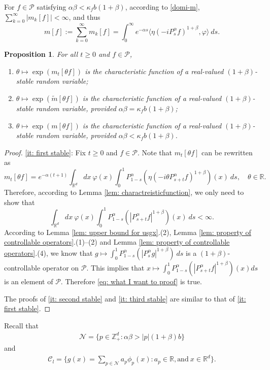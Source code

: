 \documentclass[12pt,a4paper]{amsart}
\theoremstyle{plain}
\newtheorem{prop}[thm]{Proposition}
\theoremstyle{definition}
\numberwithin{equation}{section}
\begin{document}
For  $f\in \mathcal{P}$ satisfying $\alpha\beta<\kappa_fb(1+\beta)$,
according to \eqref{domi-m}, $\sum_{k=0}^\infty |m_k[f]|<\infty$, and  thus
\begin{equation}\label{sum-m}
m[f]
    :=\sum_{k=0}^\infty m_k[f]
    =\int_0^{\infty} e^{-\alpha s} \langle \eta (-iP_s^\alpha f)^{1+\beta}, \varphi \rangle~ds.
\end{equation}

\begin{prop}
\label{cor: alpha stable rv}
	For all $t\geq 0$ and $f\in \mathcal P$,
\begin{enumerate}
\item
\label{it: first stable}
    $\theta \mapsto \exp(m_t[\theta f])$ is the characteristic function of a real-valued $(1+\beta)$-stable random variable;
\item
\label{it: second stable}
    $\theta \mapsto \exp(\tilde m[\theta f])$ is the characteristic function of a real-valued $(1+\beta)$-stable random variable, provided $\alpha\beta=\kappa_f b(1+\beta)$;
\item
\label{it: third stable}
    $\theta \mapsto \exp(m[\theta f])$ is the characteristic function of a real-valued $(1+\beta)$-stable random variable, provided $\alpha\beta < \kappa_f b(1+\beta)$.
\end{enumerate}
\end{prop}
\begin{proof}
    \eqref{it: first stable}:
	Fix $t\geq 0$ and $f\in \mathcal P$.
	Note that $m_t[\theta f]$ can be rewritten as
\[
    m_t[\theta f]= e^{-\alpha (t+1)}\int_{\mathbb R^d} dx~\varphi(x)
   \int_0^1 P_{1-s}^\alpha \left(\eta(-i\theta P_{s+t}^\alpha f)^{1+\beta}\right)(x)~ds,
    \quad \theta \in \mathbb R.
\]
	Therefore, according to Lemma \ref{lem: charactreisticfunction}, we only need to show that
\begin{equation}
\label{eq: what I want to proof}
	\int_{\mathbb R^d} dx~\varphi(x)\int_0^1 P_{1-s}^\alpha (|P_{s+t}^\alpha f|^{1+\beta})(x)~ds < \infty.
\end{equation}
	According to Lemma \ref{lem: upper bound for usgx}.(2), Lemma \ref{lem: property of controllable operators}.(1)--(2) and Lemma \ref{lem: property of controllable operators}.(4),  we know that
$
	g \mapsto \int_0^1 P_{1-s}^\alpha (|P_{s}^\alpha g|^{1+\beta})~ds
$
	is a $(1+\beta)$-controllable operator on $\mathcal P$.
	This implies that $x \mapsto \int_0^1 P_{1-s}^\alpha (|P_{s+t}^\alpha f|^{1+\beta})(x) ds$ is an element of $\mathcal P$.
	Therefore \eqref{eq: what I want to proof} is true.

    The proofs of \eqref{it: second stable} and \eqref{it: third stable} are similar to that of \eqref{it: first stable}.
\end{proof}
Recall that
\begin{align}
   \mathcal{N}=\{p\in \mathbb{Z}_+^d:  \alpha\beta>|p|(1+\beta)b\}
\end{align}
and
\begin{align}
    \mathcal{C}_l=\Big\{g(x)=\sum_{p\in\mathcal{N}}a_p\phi_p(x): a_p\in \mathbb{R}, \text{and}~ x\in\mathbb{R}^d \Big\}.
\end{align}
\end{document}
